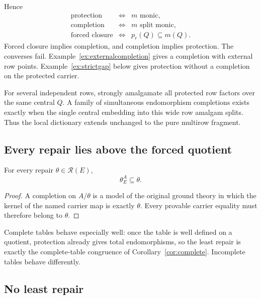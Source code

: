 Hence
\begin{equation}\label{eq:dictionary}
\boxed{
\begin{array}{rcl}
\text{protection}&\Longleftrightarrow&m\text{ monic},\\
\text{completion}&\Longleftrightarrow&m\text{ split monic},\\
\text{forced closure}&\Longleftrightarrow&p_r(Q)\subseteq m(Q).
\end{array}}
\end{equation}
Forced closure implies completion, and completion implies protection.
The converses fail. Example~\ref{ex:externalcompletion} gives a completion
with external row points. Example~\ref{ex:strictgap} below gives protection
without a completion on the protected carrier.

For several independent rows, strongly amalgamate all protected row factors over the same central $Q$.  A family of simultaneous endomorphism completions exists exactly when the single central embedding into this wide row amalgam splits.  Thus the local dictionary extends unchanged to the pure multirow fragment.

\subsection{Every repair lies above the forced quotient}

\begin{proposition}\label{prop:repairlower}
For every repair $\theta\in\mathcal R(E)$,
\[
\theta_E^A\subseteq\theta.
\]
\end{proposition}

\begin{proof}
A completion on $A/\theta$ is a model of the original ground theory in which the kernel of the named carrier map is exactly $\theta$.  Every provable carrier equality must therefore belong to $\theta$.
\end{proof}

Complete tables behave especially well: once the table is well defined on a quotient, protection already gives total endomorphisms, so the least repair is exactly the complete-table congruence of Corollary~\ref{cor:complete}.  Incomplete tables behave differently.

\subsection{No least repair}

